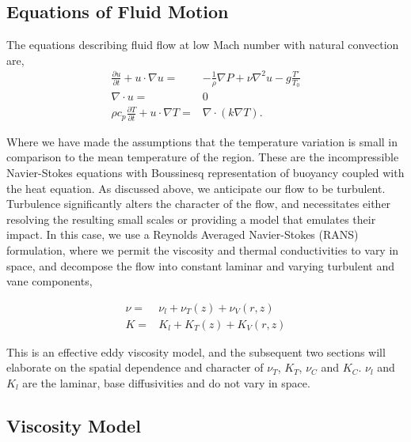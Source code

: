 \subsection{Equations of Fluid Motion}
%
%

The equations describing fluid flow at
low Mach number with natural convection are, %
\begin{eqnarray*}
 \frac{\partial u}{\partial t} + u \cdot \nabla u =&
  -\frac{1}{\rho}\nabla P + \nu \nabla^2 u - g \frac{T'}{T_0}\\
 \nabla \cdot u =& 0 \\
 \rho c_p \frac{\partial T}{\partial t} + u \cdot \nabla T =& \nabla \cdot ( k \nabla T).
\end{eqnarray*} 

Where we have made the assumptions that the temperature variation is small in
comparison to the mean temperature of the region. These are the
incompressible Navier-Stokes equations with Boussinesq representation of
buoyancy coupled with the heat equation.  
%
%
%
As discussed above, we anticipate our flow to be
turbulent. Turbulence significantly alters the character of the flow,
and necessitates either resolving the resulting small scales or
providing a model that emulates their impact. In this case, we use a
Reynolds Averaged Navier-Stokes (RANS) formulation, where we 
permit the viscosity and thermal conductivities to vary in space, and
decompose the flow into constant laminar and varying turbulent and vane
components,  


\begin{eqnarray*}
 \nu =& \nu_{l} + \nu_{T}(z) + \nu_{V}(r,z) \\
 K =& K_{l} + K_{T}(z) + K_{V}(r,z)
\end{eqnarray*}

This is an effective eddy viscosity model, and the subsequent two
sections will elaborate on the spatial dependence and character of
$\nu_T$, $K_T$, $\nu_C$ and $K_C$. $\nu_l$ and $K_l$ are the laminar,
base diffusivities and do not vary in space. 

\subsection{Viscosity Model}

